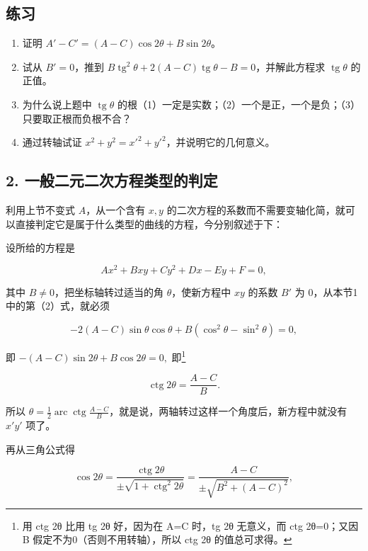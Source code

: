 \subsection{练习}\label{ux7ec3ux4e60-15}

\begin{enumerate}
\def\labelenumi{\arabic{enumi}.}
\item
  证明 \(A' - C' = (A - C)\cos 2\theta + B\sin 2\theta\)。
\item
  试从 \(B' = 0\)，推到
  \(B \operatorname{tg}^2 \theta + 2(A - C) \operatorname{tg} \theta - B = 0\)，并解此方程求
  \(\operatorname{tg} \theta\) 的正值。
\item
  为什么说上题中 \(\operatorname{tg} \theta\)
  的根（1）一定是实数；（2）一个是正，一个是负；（3）只要取正根而负根不合？
\item
  通过转轴试证 \(x^{2} + y^{2} = x'^{2} + y'^{2}\)，并说明它的几何意义。
\end{enumerate}

\subsection{2.
一般二元二次方程类型的判定}\label{ux4e00ux822cux4e8cux5143ux4e8cux6b21ux65b9ux7a0bux7c7bux578bux7684ux5224ux5b9a}

利用上节不变式 \(A\)，从一个含有 \(x, y\)
的二次方程的系数而不需要变轴化简，就可以直接判定它是属于什么类型的曲线的方程，今分别叙述于下：

设所给的方程是

\[
A x^{2} + B x y + C y^{2} + D x - E y + F = 0, \tag {1}
\]

其中 \(B \neq 0\)，把坐标轴转过适当的角 \(\theta\)，使新方程中 \(xy\)
的系数 \(B'\) 为 0，从本节1中的第（2）式，就必须

\[
- 2 (A - C) \sin \theta \cos \theta + B (\cos^{2} \theta - \sin^{2} \theta) = 0,
\]

即 \(-(A - C)\sin 2\theta + B\cos 2\theta = 0,\) 即\footnote{用 ctg 2θ
  比用 tg 2θ 好，因为在 A=C 时，tg 2θ 无意义，而 ctg 2θ=0；又因 B
  假定不为0（否则不用转轴），所以 ctg 2θ 的值总可求得。}

\[
\operatorname{ctg} 2 \theta = \frac {A - C}{B}. \tag {2}
\]

所以
\(\theta = \frac{1}{2}\operatorname{arc}\operatorname{ctg}\frac{A - C}{B}\)，就是说，两轴转过这样一个角度后，新方程中就没有
\(x'y'\) 项了。

再从三角公式得

\[
\cos 2 \theta = \frac {\operatorname{ctg} 2 \theta}{\pm \sqrt {1 + \operatorname{ctg} ^ {2} 2 \theta}} = \frac {A - C}{\pm \sqrt {B^{2} + (A - C) ^ {2}}},
\]

